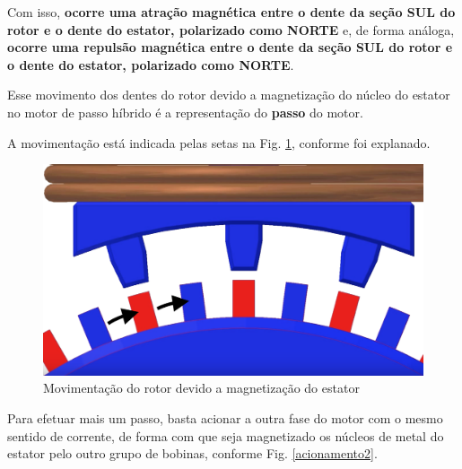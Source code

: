 	Com isso, \textbf{ocorre uma atração magnética entre o dente da seção SUL do rotor e o dente do estator, polarizado como NORTE} e, de forma análoga, \textbf{ocorre uma repulsão magnética entre o dente da seção SUL do rotor e o dente do estator, polarizado como NORTE}.
	
	Esse movimento dos dentes do rotor devido a magnetização do núcleo do estator no motor de passo híbrido é a representação do \textbf{passo} do motor.
	
	A movimentação está indicada pelas setas na Fig. \ref{passo3}, conforme foi explanado.
	
	\begin{figure}[!h]
		\centering 
		\includegraphics[scale=0.16]{images/hsm_operation/visaopasso3}
		\caption{Movimentação do rotor devido a magnetização do estator}
		\label{passo3}
	\end{figure}  
	
	Para efetuar mais um passo, basta acionar a outra fase do motor com o mesmo sentido de corrente, de forma com que seja magnetizado os núcleos de metal do estator pelo outro grupo de bobinas, conforme Fig. \ref{acionamento2}.
	
